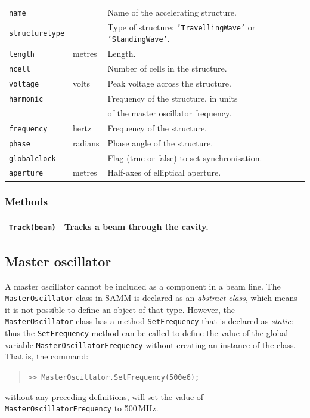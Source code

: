 \documentclass[11pt,twoside,a4paper]{article}
\begin{document}
\begin{tabular}{|l|l|l|}
\hline
\texttt{name} &              & Name of the accelerating structure.         \\
\texttt{structuretype}            &   & Type of structure: \texttt{'TravellingWave'} or \texttt{'StandingWave'}.      \\
\texttt{length}            & metres       & Length.                             \\
\texttt{ncell}            &        & Number of cells in the structure.                             \\
\texttt{voltage}           & volts        & Peak voltage across the structure.     \\
\texttt{harmonic}          &              & Frequency of the structure, in units   \\
                           &              & of the master oscillator frequency. \\
\texttt{frequency} & hertz & Frequency of the structure. \\
\texttt{phase}             & radians      & Phase angle of the structure.          \\
\texttt{globalclock}             &    & Flag (true or false) to set synchronisation.          \\
\texttt{aperture} & metres & Half-axes of elliptical aperture. \\
\hline
\end{tabular}
\vspace{0.2in}

\subsubsection{Methods}

\begin{tabular}{|l|l|}
\hline
\texttt{Track(beam)} & Tracks a beam through the cavity. \\
\hline
\end{tabular}
\vspace{0.2in}


\subsection{Master oscillator\label{sec:masteroscillator}}
A master oscillator cannot be included as a component in a beam line.  The
\texttt{MasterOscillator} class in SAMM is declared as an \emph{abstract class},
which means it is not possible to define an object of that type.  However,
the \texttt{MasterOscillator} class has a method \texttt{SetFrequency} that
is declared as \emph{static}: thus the \texttt{SetFrequency} method can be called
to define the value of the global variable \texttt{MasterOscillatorFrequency}
without creating an instance of the class.  That is, the command:
\begin{quote}
\texttt{>> MasterOscillator.SetFrequency(500e6);}
\end{quote}
without any preceding definitions, will set the value of 
\texttt{MasterOscillatorFrequency} to 500\,MHz.
\end{document}
